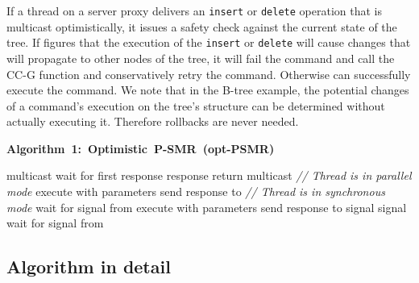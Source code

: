 \documentclass[conference]{IEEEtran}
\begin{document}
If a thread  on a server proxy delivers an \texttt{insert} or \texttt{delete} operation that is multicast optimistically, it issues a safety check against the current state of the tree. If  figures that the execution of the \texttt{insert} or \texttt{delete} will cause changes that will propagate to other nodes of the tree, it will fail the command and call the CC-G function and conservatively retry the command. Otherwise  can successfully execute the command. We note that in the B-tree example, the potential changes of a command's execution on the tree's structure can be determined without actually executing it. Therefore rollbacks are never needed. 
\begin{algorithm}
\small
\mbox{\textbf{Algorithm 1: Optimistic P-SMR (opt-PSMR)}}
\begin{distribalgo}[1]
\vspace{-3mm}
	\STATE 
	\STATE multicast
	\STATE wait for first response
	\STATE  response
	\STATE return
\ENDINDENT
\vspace{1.5mm}
\STATE 
							\STATE multicast
\ENDIF					
				\ENDIF	
			\STATE \emph{// Thread  is in parallel mode}
			\STATE execute  with  parameters
			\STATE send response to 
		\ELSE
			\STATE \emph{// Thread  is in synchronous mode}
			\STATE 
			\IF{}
					\STATE wait for signal from 
				\ENDINDENT		
				\STATE execute  with  parameters
				\STATE send response to 
					\STATE signal 
				\ENDINDENT		
			\ELSE
				\STATE signal 
				\STATE wait for signal from 
			\ENDIF
		\ENDIF
	\ENDINDENT
\ENDINDENT
\end{distribalgo}
\label{psmralg}
\end{algorithm}




\subsection{Algorithm in detail}
\label{sec:alg}
\end{document}
